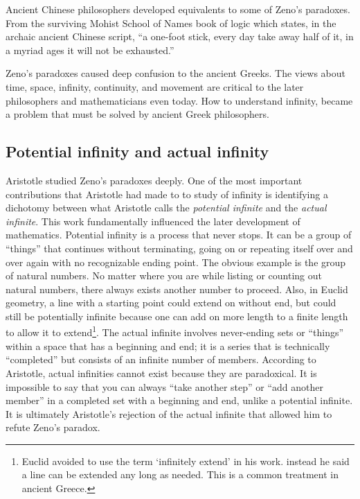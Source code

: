 \documentclass{article}
\begin{document}
Ancient Chinese philosophers developed equivalents to some of Zeno's paradoxes. From the surviving Mohist School of Names book of logic which states, in the archaic ancient Chinese script, ``a one-foot stick, every day take away half of it, in a myriad ages it will not be exhausted.''

Zeno's paradoxes caused deep confusion to the ancient Greeks. The views about time, space, infinity, continuity, and movement are critical to the later philosophers and mathematicians even today. How to understand infinity, became a problem that must be solved by ancient Greek philosophers.

\subsection{Potential infinity and actual infinity}
 

Aristotle studied Zeno's paradoxes deeply. One of the most important contributions that Aristotle had made to to study of infinity is identifying a dichotomy between what Aristotle calls the {\em potential infinite} and the {\em actual infinite}. This work fundamentally influenced the later development of mathematics\cite{HanXueTao16}. Potential infinity is a process that never stops. It can be a group of ``things'' that continues without terminating, going on or repeating itself over and over again with no recognizable ending point. The obvious example is the group of natural numbers. No matter where you are while listing or counting out natural numbers, there always exists another number to proceed. Also, in Euclid geometry, a line with a starting point could extend on without end, but could still be potentially infinite because one can add on more length to a finite length to allow it to extend\footnote{Euclid avoided to use the term `infinitely extend' in his work. instead he said a line can be extended any long as needed. This is a common treatment in ancient Greece.}. The actual infinite involves  never-ending sets or ``things'' within a space that has a beginning and end; it is a series that is technically ``completed'' but consists of an infinite number of members. According to Aristotle, actual infinities cannot exist because they are paradoxical. It is impossible to say that you can always ``take another step'' or ``add another member'' in a completed set with a beginning and end, unlike a potential infinite. It is ultimately Aristotle’s rejection of the actual infinite that allowed him to refute Zeno’s paradox.
\end{document}
